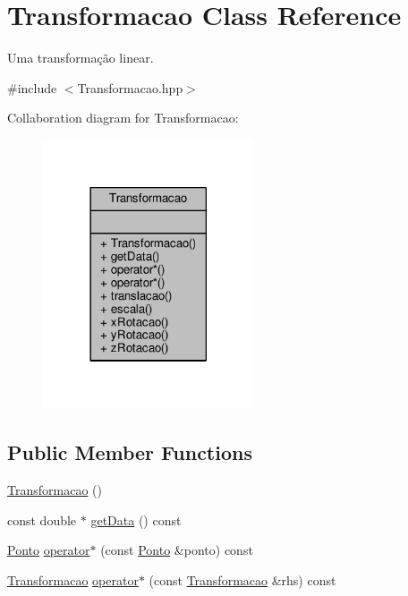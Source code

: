\hypertarget{classTransformacao}{\section{Transformacao Class Reference}
\label{classTransformacao}
}


Uma transformação linear.  




{\ttfamily \#include $<$Transformacao.\+hpp$>$}



Collaboration diagram for Transformacao\+:
\nopagebreak
\begin{figure}[H]
\begin{center}
\leavevmode
\includegraphics[width=177pt]{classTransformacao__coll__graph}
\end{center}
\end{figure}
\subsection*{Public Member Functions}
\begin{DoxyCompactItemize}
\item 
\hyperlink{classTransformacao_adc00d479b7c2d8d9ef56afe73cb74166}{Transformacao} ()
\item 
const double $\ast$ \hyperlink{classTransformacao_aab2c57d993cf832dd1dff8138dd263d9}{get\+Data} () const 
\item 
\hyperlink{classPonto}{Ponto} \hyperlink{classTransformacao_aadc2790209427a9f25df5b9f27f3ac2e}{operator$\ast$} (const \hyperlink{classPonto}{Ponto} \&ponto) const 
\item 
\hyperlink{classTransformacao}{Transformacao} \hyperlink{classTransformacao_accd6d52cc574f4d564323a84fe0c372a}{operator$\ast$} (const \hyperlink{classTransformacao}{Transformacao} \&rhs) const 
\end{DoxyCompactItemize}
